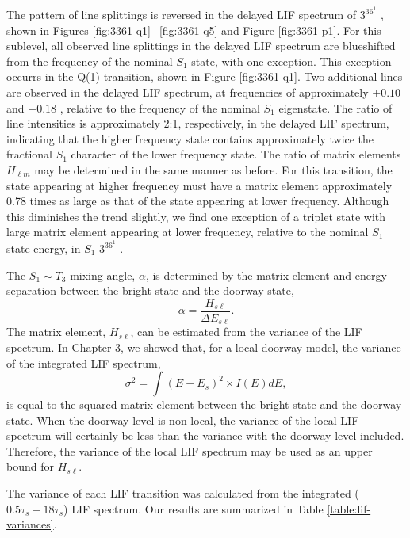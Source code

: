 \documentclass[12pt]{mitthesis}
\begin{document}
The pattern of line splittings is reversed in the delayed LIF spectrum
of $3^36^1$ , shown in Figures
\ref{fig:3361-q1}$-$\ref{fig:3361-q5} and Figure \ref{fig:3361-p1}.
For this sublevel, all observed line splittings in the delayed LIF
spectrum are blueshifted from the frequency of the nominal $S_1$
state, with one exception.  This exception occurrs in the Q(1)
transition, shown in Figure \ref{fig:3361-q1}.  Two additional lines
are observed in the delayed LIF spectrum, at frequencies of
approximately $+0.10$ and $-0.18$ \rcm, relative to the frequency of
the nominal $S_1$ eigenstate.  The ratio of line intensities is
approximately 2:1, respectively, in the delayed LIF spectrum,
indicating that the higher frequency state contains approximately
twice the fractional $S_1$ character of the lower frequency state.
The ratio of matrix elements $H_{\ell m}$ may be determined in the
same manner as before.  For this transition, the state appearing at
higher frequency must have a matrix element approximately 0.78 times
as large as that of the state appearing at lower frequency.  Although
this diminishes the trend slightly, we find one exception of a triplet
state with large matrix element appearing at lower frequency, relative
to the nominal $S_1$ state energy, in $S_1$ $3^36^1$ .

The $S_1 \sim T_3$ mixing angle, $\alpha$, is determined by the
matrix element and energy separation between the bright state and the
doorway state,
\begin{equation}
  \alpha = \frac{H_{s \ell}}{\Delta E_{s\ell}}.
\end{equation}
The matrix element, $H_{s \ell}$, can be estimated from the variance
of the LIF spectrum.  In Chapter 3, we showed that, for a local
doorway model, the variance of the integrated LIF spectrum,
\begin{equation}
  \label{eq:doorway-var}
  \sigma^2 = \int (E - E_s)^2 \times I(E) dE,
\end{equation}
is equal to the squared matrix element between the bright state and
the doorway state.  When the doorway level is non-local, the variance
of the local LIF spectrum will certainly be less than the variance
with the doorway level included.  Therefore, the variance of the local
LIF spectrum may be used as an upper bound for $H_{s \ell}$.

The variance of each LIF transition was calculated from the integrated
($0.5\tau_s-18\tau_s$) LIF spectrum.  Our results are summarized in
Table \ref{table:lif-variances}.  
\end{document}

